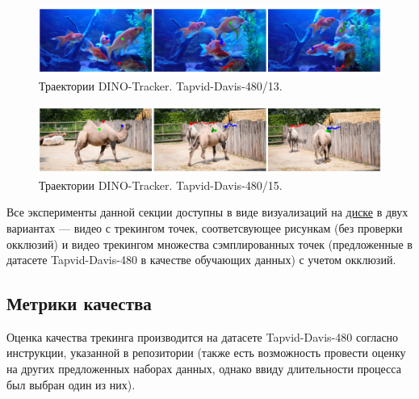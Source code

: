 \documentclass[a4paper, 14pt]{extarticle}
\theoremstyle{definition}
\theoremstyle{plain}
\theoremstyle{remark}
\begin{document}
\begin{figure}
    [H]
    \centering
    \includegraphics[width=\textwidth]{figs/davis-13.png}
    \caption{Траектории DINO-Tracker. Tapvid-Davis-480/13.}
    \label{fig:davis-13}
\end{figure}
\begin{figure}
    [H]
    \centering
    \includegraphics[width=\textwidth]{figs/davis-15.png}
    \caption{Траектории DINO-Tracker. Tapvid-Davis-480/15.}
    \label{fig:davis-15}
\end{figure}

Все эксперименты данной секции доступны в виде визуализаций на \href{https://drive.google.com/drive/folders/1lrNxilkdl0-vznN1TfMgSNOFz2cYQjS7?usp=drive_link}{диске} в двух вариантах --- видео с трекингом точек, соответсвующее рисункам (без проверки окклюзий) и видео трекингом множества сэмплированных точек (предложенные в датасете Tapvid-Davis-480 в качестве обучающих данных) с учетом окклюзий.

\subsection{Метрики качества}

Оценка качества трекинга производится на датасете Tapvid-Davis-480 согласно инструкции, указанной в репозитории (также есть возможность провести оценку на других предложенных наборах данных, однако ввиду длительности процесса был выбран один из них).
\end{document}
